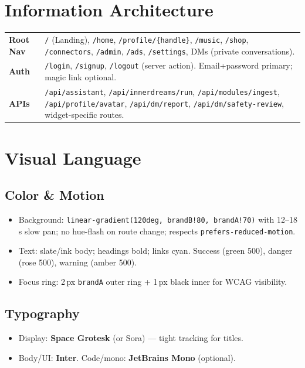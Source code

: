 \documentclass[11pt]{article}
\begin{document}
\section{Information Architecture}
\begin{longtable}{>{\bfseries}p{3.2cm}p{11cm}}
Root Nav & \texttt{/} (Landing), \texttt{/home}, \texttt{/profile/\{handle\}}, \texttt{/music}, \texttt{/shop}, \texttt{/connectors}, \texttt{/admin}, \texttt{/ads}, \texttt{/settings}, DMs (private conversations). \\
Auth & \texttt{/login}, \texttt{/signup}, \texttt{/logout} (server action). Email+password primary; magic link optional. \\
APIs & \texttt{/api/assistant}, \texttt{/api/innerdreams/run}, \texttt{/api/modules/ingest}, \texttt{/api/profile/avatar}, \texttt{/api/dm/report}, \texttt{/api/dm/safety-review}, widget-specific routes. \\
\end{longtable}

\section{Visual Language}
\subsection{Color \& Motion}
\begin{itemize}
  \item Background: \texttt{linear-gradient(120deg, brandB!80, brandA!70)} with 12--18\,s slow pan; no hue-flash on route change; respects \texttt{prefers-reduced-motion}.
  \item Text: slate/ink body; headings bold; links cyan. Success (green 500), danger (rose 500), warning (amber 500).
  \item Focus ring: 2\,px \texttt{brandA} outer ring + 1\,px black inner for WCAG visibility.
\end{itemize}

\subsection{Typography}
\begin{itemize}
  \item Display: \textbf{Space Grotesk} (or Sora) --- tight tracking for titles.
  \item Body/UI: \textbf{Inter}. Code/mono: \textbf{JetBrains Mono} (optional).
\end{itemize}
\end{document}
